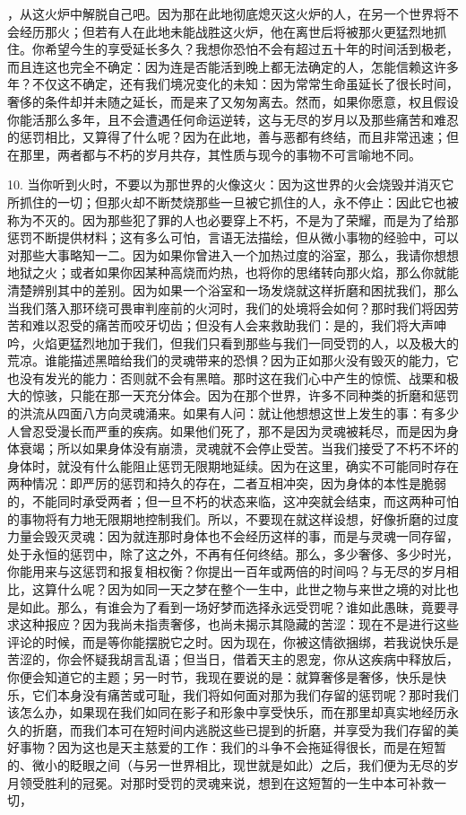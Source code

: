 ，从这火炉中解脱自己吧。因为那在此地彻底熄灭这火炉的人，在另一个世界将不会经历那火；但若有人在此地未能战胜这火炉，他在离世后将被那火更猛烈地抓住。你希望今生的享受延长多久？我想你恐怕不会有超过五十年的时间活到极老，而且连这也完全不确定：因为连是否能活到晚上都无法确定的人，怎能信赖这许多年？不仅这不确定，还有我们境况变化的未知：因为常常生命虽延长了很长时间，奢侈的条件却并未随之延长，而是来了又匆匆离去。然而，如果你愿意，权且假设你能活那么多年，且不会遭遇任何命运逆转，这与无尽的岁月以及那些痛苦和难忍的惩罚相比，又算得了什么呢？因为在此地，善与恶都有终结，而且非常迅速；但在那里，两者都与不朽的岁月共存，其性质与现今的事物不可言喻地不同。\par

10. 当你听到火时，不要以为那世界的火像这火：因为这世界的火会烧毁并消灭它所抓住的一切；但那火却不断焚烧那些一旦被它抓住的人，永不停止：因此它也被称为不灭的。因为那些犯了罪的人也必要穿上不朽，不是为了荣耀，而是为了给那惩罚不断提供材料；这有多么可怕，言语无法描绘，但从微小事物的经验中，可以对那些大事略知一二。因为如果你曾进入一个加热过度的浴室，那么，我请你想想地狱之火；或者如果你因某种高烧而灼热，也将你的思绪转向那火焰，那么你就能清楚辨别其中的差别。因为如果一个浴室和一场发烧就这样折磨和困扰我们，那么当我们落入那环绕可畏审判座前的火河时，我们的处境将会如何？那时我们将因劳苦和难以忍受的痛苦而咬牙切齿；但没有人会来救助我们：是的，我们将大声呻吟，火焰更猛烈地加于我们，但我们只看到那些与我们一同受罚的人，以及极大的荒凉。谁能描述黑暗给我们的灵魂带来的恐惧？因为正如那火没有毁灭的能力，它也没有发光的能力：否则就不会有黑暗。那时这在我们心中产生的惊慌、战栗和极大的惊骇，只能在那一天充分体会。因为在那个世界，许多不同种类的折磨和惩罚的洪流从四面八方向灵魂涌来。如果有人问：就让他想想这世上发生的事：有多少人曾忍受漫长而严重的疾病。如果他们死了，那不是因为灵魂被耗尽，而是因为身体衰竭；所以如果身体没有崩溃，灵魂就不会停止受苦。当我们接受了不朽不坏的身体时，就没有什么能阻止惩罚无限期地延续。因为在这里，确实不可能同时存在两种情况：即严厉的惩罚和持久的存在，二者互相冲突，因为身体的本性是脆弱的，不能同时承受两者；但一旦不朽的状态来临，这冲突就会结束，而这两种可怕的事物将有力地无限期地控制我们。所以，不要现在就这样设想，好像折磨的过度力量会毁灭灵魂：因为就连那时身体也不会经历这样的事，而是与灵魂一同存留，处于永恒的惩罚中，除了这之外，不再有任何终结。那么，多少奢侈、多少时光，你能用来与这惩罚和报复相权衡？你提出一百年或两倍的时间吗？与无尽的岁月相比，这算什么呢？因为如同一天之梦在整个一生中，此世之物与来世之境的对比也是如此。那么，有谁会为了看到一场好梦而选择永远受罚呢？谁如此愚昧，竟要寻求这种报应？因为我尚未指责奢侈，也尚未揭示其隐藏的苦涩：现在不是进行这些评论的时候，而是等你能摆脱它之时。因为现在，你被这情欲捆绑，若我说快乐是苦涩的，你会怀疑我胡言乱语；但当日，借着天主的恩宠，你从这疾病中释放后，你便会知道它的主题；另一时节，我现在要说的是：就算奢侈是奢侈，快乐是快乐，它们本身没有痛苦或可耻，我们将如何面对那为我们存留的惩罚呢？那时我们该怎么办，如果现在我们如同在影子和形象中享受快乐，而在那里却真实地经历永久的折磨，而我们本可在短时间内逃脱这些已提到的折磨，并享受为我们存留的美好事物？因为这也是天主慈爱的工作：我们的斗争不会拖延得很长，而是在短暂的、微小的眨眼之间（与另一世界相比，现世就是如此）之后，我们便为无尽的岁月领受胜利的冠冕。对那时受罚的灵魂来说，想到在这短暂的一生中本可补救一切，